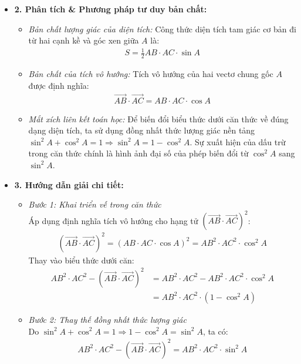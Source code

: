 \documentclass[12pt,a4paper]{article}
\begin{document}
\begin{itemize}
\begin{itemize}
        \item \textbf{2. Phân tích \& Phương pháp tư duy bản chất:}
        \begin{itemize}
            \item \textit{Bản chất lượng giác của diện tích:} Công thức diện tích tam giác cơ bản đi từ hai cạnh kề và góc xen giữa $A$ là:
            \begin{align*}
                S = \frac{1}{2}AB \cdot AC \cdot \sin A
            \end{align*}
            \item \textit{Bản chất của tích vô hướng:} Tích vô hướng của hai vectơ chung gốc $A$ được định nghĩa:
            \begin{align*}
                \vec{AB} \cdot \vec{AC} = AB \cdot AC \cdot \cos A
            \end{align*}
            \item \textit{Mắt xích liên kết toán học:} Để biến đổi biểu thức dưới căn thức về đúng dạng diện tích, ta sử dụng đồng nhất thức lượng giác nền tảng $\sin^2 A + \cos^2 A = 1 \Longrightarrow \sin^2 A = 1 - \cos^2 A$. Sự xuất hiện của dấu trừ trong căn thức chính là hình ảnh đại số của phép biến đổi từ $\cos^2 A$ sang $\sin^2 A$.
        \end{itemize}

        \item \textbf{3. Hướng dẫn giải chi tiết:}
        \begin{itemize}
            \item \textit{Bước 1: Khai triển vế trong căn thức}\\
            Áp dụng định nghĩa tích vô hướng cho hạng tử $(\vec{AB} \cdot \vec{AC})^2$:
            \begin{align*}
                (\vec{AB} \cdot \vec{AC})^2 = (AB \cdot AC \cdot \cos A)^2 = AB^2 \cdot AC^2 \cdot \cos^2 A
            \end{align*}
            Thay vào biểu thức dưới căn:
            \begin{align*}
                AB^2 \cdot AC^2 - (\vec{AB} \cdot \vec{AC})^2 &= AB^2 \cdot AC^2 - AB^2 \cdot AC^2 \cdot \cos^2 A \\
                &= AB^2 \cdot AC^2 \cdot (1 - \cos^2 A)
            \end{align*}

            \item \textit{Bước 2: Thay thế đồng nhất thức lượng giác}\\
            Do $\sin^2 A + \cos^2 A = 1 \Longrightarrow 1 - \cos^2 A = \sin^2 A$, ta có:
            \begin{align*}
                AB^2 \cdot AC^2 - (\vec{AB} \cdot \vec{AC})^2 = AB^2 \cdot AC^2 \cdot \sin^2 A
            \end{align*}


\end{itemize}
\end{itemize}
\end{itemize}
\end{document}
